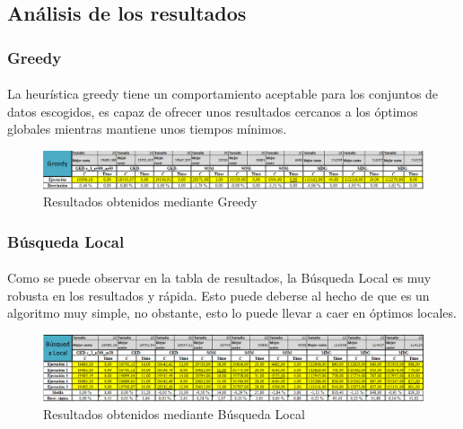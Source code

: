 \documentclass{article}
\begin{document}
	
	\subsection{Análisis de los resultados}
	
		\subsubsection{Greedy}
		
				\paragraph{}La heurística greedy tiene un comportamiento aceptable para los conjuntos de datos escogidos, es capaz de ofrecer unos resultados cercanos a los óptimos globales mientras mantiene unos tiempos mínimos.
			
			\begin{figure}[H]
				
				\centering
				\includegraphics[scale=0.4]{img/greegyResult}
				\caption{Resultados obtenidos mediante Greedy}
				
			\end{figure}
		
		\subsubsection{Búsqueda Local}
		
				\paragraph{}Como se puede observar en la tabla de resultados, la Búsqueda Local es muy robusta en los resultados y rápida. Esto puede deberse al hecho de que es un algoritmo muy simple, no obstante, esto lo puede llevar a caer en óptimos locales.
			
			\begin{figure}[H]
				
				\centering
				\includegraphics[scale=0.4]{img/blocalResult}
				\caption{Resultados obtenidos mediante Búsqueda Local}
				
			\end{figure}
			
\end{document}
